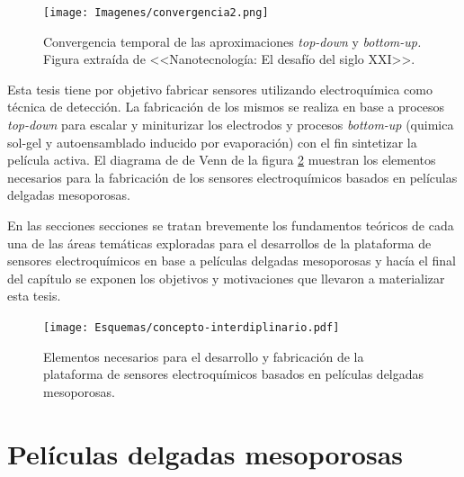 			\begin{figure}[ht!]
 				\begin{center}
 				\texttt{[image: Imagenes/convergencia2.png]}
 				\caption[Convergencia \textit{top-down }y \textit{bottom-up.}]{Convergencia temporal de las aproximaciones \textit{top-down }y \textit{bottom-up.} Figura extraída de <<Nanotecnología: El desafío del siglo XXI>>.}
 				\label{fig:galo-convergencia}
 		   	    \end{center}
 		   	    \end{figure}

    	Esta tesis tiene por objetivo fabricar sensores utilizando electroquímica como técnica de detección. La fabricación de los mismos se realiza en base a procesos \textit{top-down} para escalar y miniturizar los electrodos y procesos \textit{bottom-up} (quimica sol-gel y autoensamblado inducido por evaporación) con el fin sintetizar la película activa. El diagrama de  de Venn de la figura \ref{fig:sensores} muestran los elementos necesarios para la fabricación de los sensores electroquímicos basados en películas delgadas mesoporosas. 
	 	
 		En las secciones secciones se tratan brevemente los fundamentos teóricos de cada una de las áreas temáticas exploradas para el desarrollos de la plataforma de sensores electroquímicos en base a películas delgadas mesoporosas y hacía el final del capítulo se exponen los objetivos y motivaciones que llevaron a materializar esta tesis.


	       \begin{figure}[ht!]
 				\begin{center}
 				\texttt{[image: Esquemas/concepto-interdiplinario.pdf]}
 				\caption[Plataforma de sensores. Diagrama de Venn.]{Elementos necesarios para el desarrollo y fabricación de la plataforma de sensores electroquímicos basados en películas delgadas mesoporosas.}
 		   		\label{fig:sensores}
 		    	\end{center}
 		    	\end{figure}
\section{Películas delgadas mesoporosas}\label{sec:mesoporosos}
	
